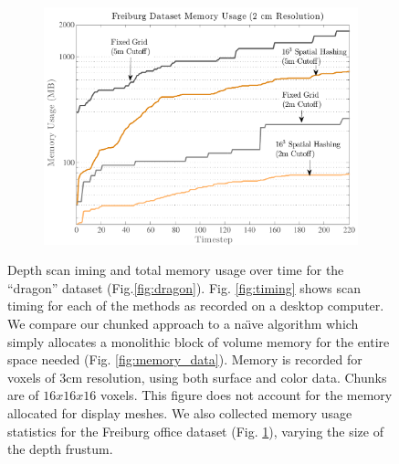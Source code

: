 \begin{figure}
\begin{subfigure}{0.75\columnwidth}
\includegraphics[width=1.0\textwidth]{img/memoryusage2.pdf}
		 \caption{} 
		 \label{fig:memory_data2}
	 \end{subfigure} 
      \caption{Depth scan iming and total memory usage over time for the
      ``dragon'' dataset (Fig.\ref{fig:dragon}). Fig. \ref{fig:timing} shows
      scan timing for 
each of the methods as recorded on a desktop computer. We compare our chunked
      approach to a na\"{\i}ve algorithm which simply allocates a monolithic
      block of volume memory for the entire space needed (Fig. \ref{fig:memory_data}).
      Memory is recorded for voxels of 3cm resolution, using both surface and
      color data. Chunks are of $16x16x16$ voxels. This figure does not account
      for the memory allocated for display meshes. We also collected memory
      usage statistics for the Freiburg \cite{FREIBURG} office dataset (Fig.
      \ref{fig:memory_data2}), varying the size of the depth frustum.}
  \label{fig:memory}
\end{figure} 

